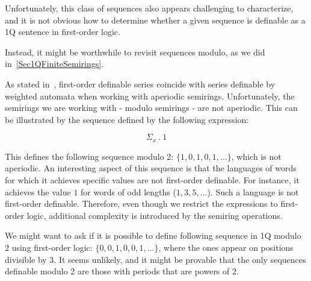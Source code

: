 \documentclass[12pt]{article}
\theoremstyle{definition}
\begin{document}
Unfortunately, this class of sequences also appears challenging to characterize, and it is not obvious how to determine whether a given sequence is definable as a 1Q sentence in first-order logic.

Instead, it might be worthwhile to revisit sequences modulo, as we did in~\cref{Sec1QFiniteSemirings}.

As stated in~\cite{DrosteG07}, first-order definable series coincide with series definable by weighted automata when working with aperiodic semirings. Unfortunately, the semirings we are working with - modulo semirings - are not aperiodic. This can be illustrated by the sequence defined by the following expression:

$$ \Sigma_x \ . \ 1 $$

This defines the following sequence modulo 2: $\{1, 0, 1, 0, 1, \ldots\}$, which is not aperiodic. An interesting aspect of this sequence is that the languages of words for which it achieves specific values are not first-order definable. For instance, it achieves the value $1$ for words of odd lengths ($1, 3, 5, \ldots$). Such a language is not first-order definable. Therefore, even though we restrict the expressions to first-order logic, additional complexity is introduced by the semiring operations.

We might want to ask if it is possible to define following sequence in 1Q modulo $2$ using first-order logic: $\{0, 0, 1, 0, 0, 1, \ldots\}$, where the ones appear on positions divisible by 3. It seems unlikely, and it might be provable that the only sequences definable modulo 2 are those with periods that are powers of $2$.



\end{document}
